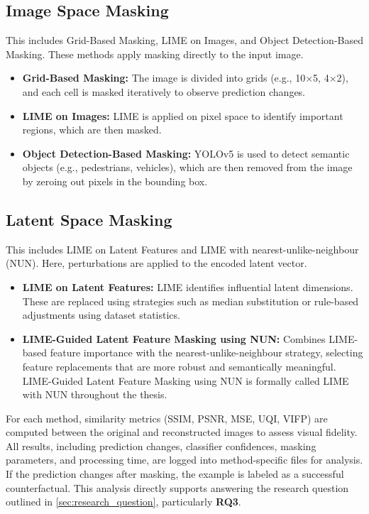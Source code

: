 \subsection*{Image Space Masking}
This includes Grid-Based Masking, LIME on Images, and Object Detection-Based Masking. These methods apply masking directly to the input image.
\begin{itemize}
    \item \textbf{Grid-Based Masking:} The image is divided into grids (e.g., 10$\times$5, 4$\times$2), and each cell is masked iteratively to observe prediction changes.
    \item \textbf{LIME on Images:} LIME is applied on pixel space to identify important regions, which are then masked.
    \item \textbf{Object Detection-Based Masking:} YOLOv5 is used to detect semantic objects (e.g., pedestrians, vehicles), which are then removed from the image by zeroing out pixels in the bounding box.
\end{itemize}

\subsection*{Latent Space Masking}
This includes LIME on Latent Features and LIME with nearest-unlike-neighbour (NUN). Here, perturbations are applied to the encoded latent vector.
\begin{itemize}
    \item \textbf{LIME on Latent Features:} LIME identifies influential latent dimensions. These are replaced using strategies such as median substitution or rule-based adjustments using dataset statistics.
    \item \textbf{LIME-Guided Latent Feature Masking using NUN:} Combines LIME-based feature importance with the nearest-unlike-neighbour strategy, selecting feature replacements that are more robust and semantically meaningful. LIME-Guided Latent Feature Masking using NUN is formally called LIME with NUN throughout the thesis.
\end{itemize}

For each method, similarity metrics (SSIM, PSNR, MSE, UQI, VIFP) are computed between the original and reconstructed images to assess visual fidelity. All results, including prediction changes, classifier confidences, masking parameters, and processing time, are logged into method-specific files for analysis. If the prediction changes after masking, the example is labeled as a successful counterfactual. This analysis directly supports answering the research question outlined in \cref{sec:research_question}, particularly \textbf{RQ3}.


